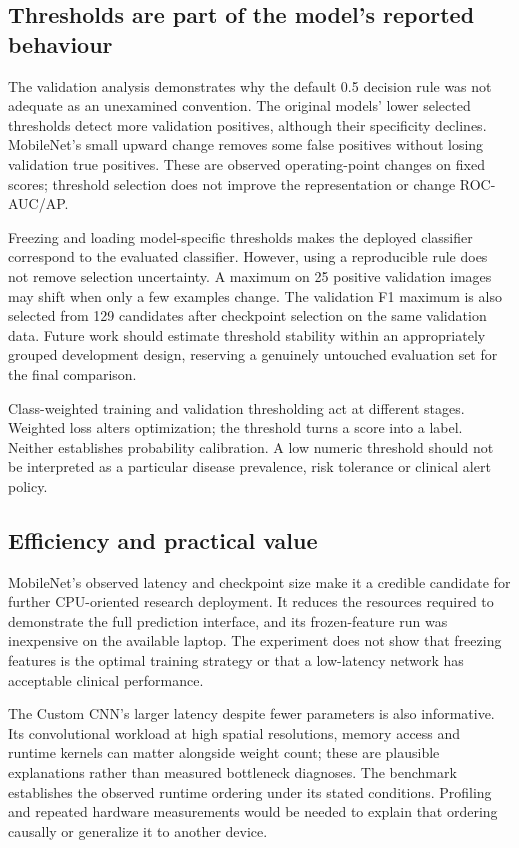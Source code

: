 \documentclass[11pt,a4paper]{article}
\begin{document}
\subsection{Thresholds are part of the model's reported behaviour}
The validation analysis demonstrates why the default 0.5 decision rule was not adequate as an unexamined convention. The original models' lower selected thresholds detect more validation positives, although their specificity declines. MobileNet's small upward change removes some false positives without losing validation true positives. These are observed operating-point changes on fixed scores; threshold selection does not improve the representation or change ROC-AUC/AP.

Freezing and loading model-specific thresholds makes the deployed classifier correspond to the evaluated classifier. However, using a reproducible rule does not remove selection uncertainty. A maximum on 25 positive validation images may shift when only a few examples change. The validation F1 maximum is also selected from 129 candidates after checkpoint selection on the same validation data. Future work should estimate threshold stability within an appropriately grouped development design, reserving a genuinely untouched evaluation set for the final comparison.

Class-weighted training and validation thresholding act at different stages. Weighted loss alters optimization; the threshold turns a score into a label. Neither establishes probability calibration. A low numeric threshold should not be interpreted as a particular disease prevalence, risk tolerance or clinical alert policy.

\subsection{Efficiency and practical value}
MobileNet's observed latency and checkpoint size make it a credible candidate for further CPU-oriented research deployment. It reduces the resources required to demonstrate the full prediction interface, and its frozen-feature run was inexpensive on the available laptop. The experiment does not show that freezing features is the optimal training strategy or that a low-latency network has acceptable clinical performance.

The Custom CNN's larger latency despite fewer parameters is also informative. Its convolutional workload at high spatial resolutions, memory access and runtime kernels can matter alongside weight count; these are plausible explanations rather than measured bottleneck diagnoses. The benchmark establishes the observed runtime ordering under its stated conditions. Profiling and repeated hardware measurements would be needed to explain that ordering causally or generalize it to another device.
\end{document}

